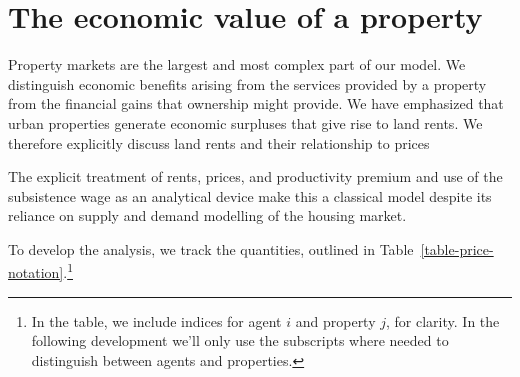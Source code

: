 

\section{The economic value of a property} \label{section-rent}
Property markets are the largest and most complex part of our model. We distinguish economic benefits arising from the services provided by a property from the financial gains that ownership might provide. We have emphasized that urban properties generate economic surpluses that give rise to land rents. We therefore explicitly discuss land rents and their relationship to prices  

 The explicit treatment of rents, prices, and  productivity \gls{premium} and use of the \gls{subsistence wage} as an analytical device  make this a \gls{classical} model despite its reliance on supply and demand modelling of the housing market. 

 To develop the analysis, we track the quantities, outlined in Table~\ref{table-price-notation}.\footnote{In the table, we include indices for agent $i$ and property $j$, for clarity. In the following development we'll only use the subscripts where needed to distinguish between agents and properties.}

